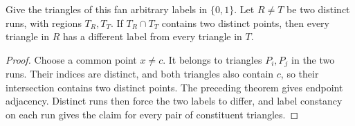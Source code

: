 \begin{lemma}
    \label{thm:area_law_fan_run_geometric_contact}
    \leanok
    Give the triangles of this fan arbitrary labels in $\{0,1\}$.
    Let $R\ne T$ be two distinct runs, with regions $T_R,T_T$.
    If $T_R\cap T_T$ contains two distinct points, then every triangle
    in $R$ has a different label from every triangle in $T$.
\end{lemma}
\begin{proof}\leanok
    Choose a common point $x\ne c$. It belongs to triangles $P_i,P_j$
    in the two runs. Their indices are distinct, and both triangles also
    contain $c$, so their intersection contains two distinct points.
    The preceding theorem gives endpoint adjacency. Distinct runs then
    force the two labels to differ, and label constancy on each run gives
    the claim for every pair of constituent triangles.
\end{proof}
